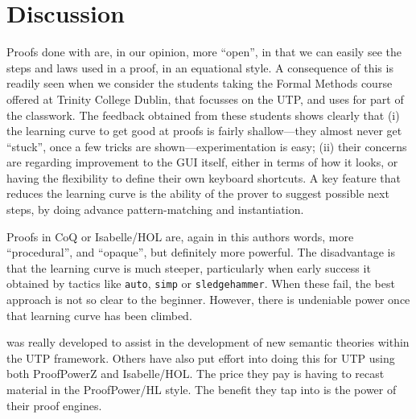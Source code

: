\section{Discussion}

Proofs done with  are, in our opinion, more ``open'',
in that we can easily see the steps and laws used in a proof, in an equational style.
A consequence of this is readily seen when we consider the students taking the
Formal Methods course offered at Trinity College Dublin, that focusses on the
UTP, and uses  for part of the classwork.
The feedback obtained from these students shows clearly that
(i) the learning curve to get good at  proofs is fairly shallow---they almost never
get ``stuck'', once a few tricks are shown---experimentation is easy;
(ii) their concerns are regarding improvement to the GUI itself,
either in terms of how it looks, or having the flexibility to define their own keyboard
shortcuts.
A key feature that reduces the learning curve is the ability
of the prover to suggest possible next steps, by doing advance pattern-matching
and instantiation.

Proofs in CoQ or Isabelle/HOL are, again in this authors words, more ``procedural'',
and ``opaque'', but definitely more powerful. The disadvantage is that the learning
curve is much steeper, particularly when early success it obtained by tactics like
\texttt{auto}, \texttt{simp} or \texttt{sledgehammer}.
When these fail, the best approach is not so clear to the beginner.
However, there is undeniable power once that learning curve has been climbed.

 was really developed to assist in the development of new semantic theories
within the UTP framework. Others have also put effort into doing this for UTP
using both ProofPowerZ\cite{conf/utp/ZC08}
and Isabelle/HOL\cite{conf/vstte/FeliachiGW12,conf/utp/FZW14}.
The price they pay is having to recast material in the ProofPower/HL style.
The benefit they tap into is the power of their proof engines.

